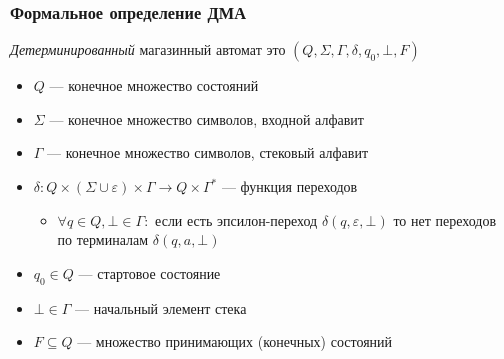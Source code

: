 \documentclass[dvipsnames]{beamer}
\newcommand{\state}[1]{{\color{red}{#1}}}
\newcommand{\stack}[1]{{\color{blue}{#1}}}
\newcommand{\symbl}[1]{{\color{PineGreen}{#1}}}
\newcommand{\conf}[3]{( \state{#1},\symbl{#2},\stack{#3} )}
\newenvironment{myauto}[1][3]
{
  \begin{center}
    \begin{tikzpicture}[> = stealth,node distance=#1cm, on grid, very thick]
}
{
    \end{tikzpicture}
  \end{center}
}
\begin{document}



\begin{frame}[fragile]
  \frametitle{Формальное определение ДМА}
  \emph{Детерминированный} магазинный автомат это $(Q, \Sigma, \Gamma, \delta, q_0, \bot, F)$
  \begin{itemize}
    \item $Q$ --- конечное множество состояний
    \item $\Sigma$ --- конечное множество символов, входной алфавит
    \item $\Gamma$ --- конечное множество символов, стековый алфавит
    \item $\delta: Q \times (\Sigma \cup \varepsilon) \times \Gamma \to Q \times \Gamma^*$ --- функция переходов
    \begin{itemize}
      \item $\forall q \in Q, \bot \in \Gamma:$ если есть эпсилон-переход $\delta(q, \varepsilon, \bot)$ то нет переходов по терминалам $\delta(q, a, \bot)$
    \end{itemize}
    \item $q_0 \in Q$ --- стартовое состояние
    \item $\bot \in \Gamma$ --- начальный элемент стека
    \item $F \subseteq Q$ --- множество принимающих (конечных) состояний
  \end{itemize}
\end{frame}
\end{document}
